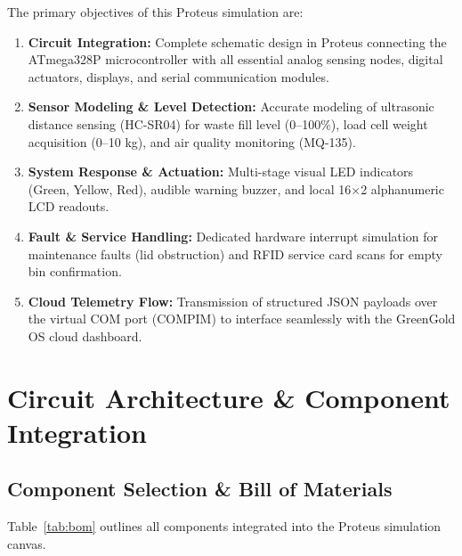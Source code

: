 \documentclass[12pt,a4paper]{article}
\begin{document}
The primary objectives of this Proteus simulation are:
\begin{enumerate}[leftmargin=*]
    \item \textbf{Circuit Integration:} Complete schematic design in Proteus connecting the ATmega328P microcontroller with all essential analog sensing nodes, digital actuators, displays, and serial communication modules.
    \item \textbf{Sensor Modeling \& Level Detection:} Accurate modeling of ultrasonic distance sensing (HC-SR04) for waste fill level (0--100\%), load cell weight acquisition (0--10 kg), and air quality monitoring (MQ-135).
    \item \textbf{System Response \& Actuation:} Multi-stage visual LED indicators (Green, Yellow, Red), audible warning buzzer, and local 16$\times$2 alphanumeric LCD readouts.
    \item \textbf{Fault \& Service Handling:} Dedicated hardware interrupt simulation for maintenance faults (lid obstruction) and RFID service card scans for empty bin confirmation.
    \item \textbf{Cloud Telemetry Flow:} Transmission of structured JSON payloads over the virtual COM port (COMPIM) to interface seamlessly with the GreenGold OS cloud dashboard.
\end{enumerate}

\section{Circuit Architecture \& Component Integration}

\subsection{Component Selection \& Bill of Materials}
Table~\ref{tab:bom} outlines all components integrated into the Proteus simulation canvas.
\end{document}
